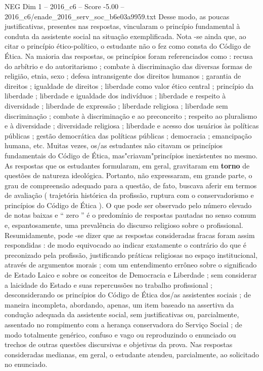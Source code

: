 \begin{textsample}{NEG Dim 1 – 2016\_c6 – Score -5.00 – 2016\_c6/enade\_2016\_serv\_soc\_b6e03a9959.txt}
Desse modo, as poucas justificativas, presentes nas respostas, vincularam o princípio fundamental à conduta da assistente social na situação exemplificada.
Nota -se ainda que, ao citar o princípio ético-político, o estudante não o fez como consta do Código de Ética.
Na maioria das respostas, os princípios foram referenciados como : recusa do arbítrio e do autoritarismo ; combate à discriminação das diversas formas de religião, etnia, sexo ; defesa intransigente dos direitos humanos ; garantia de direitos ; igualdade de direitos ; liberdade como valor ético central ; princípio da liberdade ; liberdade e igualdade dos indivíduos ; liberdade e respeito à diversidade ; liberdade de expressão ; liberdade religiosa ; liberdade sem discriminação ; combate à discriminação e ao preconceito ; respeito ao pluralismo e à diversidade ; diversidade religiosa ; liberdade e acesso dos usuários às políticas públicas ; gestão democrática das políticas públicas ; democracia ; emancipação humana, etc.
Muitas vezes, os/as estudantes não citavam os princípios fundamentais do Código de Ética, mas"criavam"princípios inexistentes no mesmo.
As respostas que os estudantes formularam, em geral, gravitaram em \textbf{torno} de questões de natureza ideológica.
Portanto, não expressaram, em grande parte, o grau de compreensão adequado para a questão, de fato, buscava aferir em termos de avaliação ( trajetória histórica da profissão, ruptura com o conservadorismo e princípios do Código de Ética ).
O que pode ser observado pelo número elevado de notas baixas e “ zero ” é o predomínio de respostas pautadas no senso comum e, espantosamente, uma prevalência do discurso religioso sobre o profissional.
Resumidamente, pode -se dizer que as respostas consideradas fracas foram assim respondidas : de modo equivocado ao indicar exatamente o contrário do que é preconizado pela profissão, justificando práticas religiosas no espaço institucional, através de argumentos morais ; com um entendimento errôneo sobre o significado de Estado Laico e sobre os conceitos de Democracia e Liberdade ; sem considerar a laicidade do Estado e suas repercussões no trabalho profissional ; desconsiderando os princípios do Código de Ética dos/as assistentes sociais ; de maneira incompleta, abordando, apenas, um item baseado na assertiva da condução adequada da assistente social, sem justificativas ou, parcialmente, assentado no rompimento com a herança conservadora do Serviço Social ; de modo totalmente genérico, confuso e vago ou reproduzindo o enunciado ou trechos de outras questões discursivas e objetivas da prova.
Nas respostas consideradas medianas, em geral, o estudante atendeu, parcialmente, ao solicitado no enunciado.

\end{textsample}

